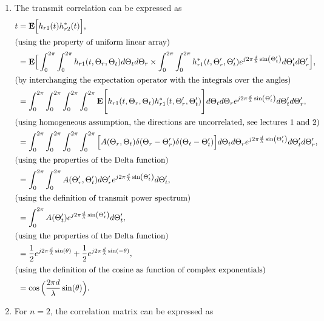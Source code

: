 \documentclass [a4paper, 11pt] {article}
\begin{document}
\begin{solution}
\begin{enumerate}
    \item The transmit correlation can be expressed as
    \begin{align}
        t &= \mathbf{E}\Big[h_{r1}(t)h_{r2}^*(t) \Big], \\
        \intertext{(using the property of uniform linear array)}
        &= \mathbf{E}\Big[\int_{0}^{2\pi} \int_{0}^{2\pi}h_{r1}(t,\Theta_r,\Theta_t) d\Theta_t d\Theta_r \times \int_{0}^{2\pi} \int_{0}^{2\pi}h_{r1}^*(t,\Theta_r',\Theta_t')e^{j2\pi\frac{d}{\lambda}\sin(\Theta_t')} d\Theta_t' d\Theta_r'\Big], \\
        \intertext{(by interchanging the expectation operator with the integrals over the angles)}
        &= \int_{0}^{2\pi} \int_{0}^{2\pi}\int_{0}^{2\pi} \int_{0}^{2\pi} \mathbf{E}\Bigg[h_{r1}(t,\Theta_r,\Theta_t)h_{r1}^*(t,\Theta_r',\Theta_t')\Bigg] d\Theta_t d\Theta_r e^{j2\pi\frac{d}{\lambda}\sin(\Theta_t')} d\Theta_t' d\Theta_r', \\
        \intertext{(using homogeneous assumption, the directions are uncorrelated, see lectures 1 and 2)}
        &= \int_{0}^{2\pi} \int_{0}^{2\pi}\int_{0}^{2\pi} \int_{0}^{2\pi}  \Big[A(\Theta_r,\Theta_t)\delta(\Theta_r - \Theta_r') \delta(\Theta_t - \Theta_t')\Big] d\Theta_t d\Theta_r e^{j2\pi\frac{d}{\lambda}\sin(\Theta_t')} d\Theta_t' d\Theta_r', \\
        \intertext{(using the properties of the Delta function)}
        &= \int_{0}^{2\pi} \int_{0}^{2\pi} A(\Theta_r',\Theta_t') d\Theta_r' e^{j2\pi\frac{d}{\lambda}\sin(\Theta_t')}  d\Theta_t', \\
        \intertext{(using the definition of transmit power spectrum)}
        &= \int_{0}^{2\pi} A(\Theta_t') e^{j2\pi\frac{d}{\lambda}\sin(\Theta_t')}  d\Theta_t', \\
        \intertext{(using the properties of the Delta function)}
        &= \frac{1}{2}e^{j2\pi\frac{d}{\lambda}\sin(\theta)}
        + \frac{1}{2}e^{j2\pi\frac{d}{\lambda}\sin(-\theta)}, \\
        \intertext{(using the definition of the cosine as function of complex exponentials)}
        &= \cos \Big( \frac{2 \pi d}{\lambda} \sin (\theta) \Big).
    \end{align}

    \item For $n = 2$, the correlation matrix can be expressed as


\end{enumerate}
\end{solution}
\end{document}
